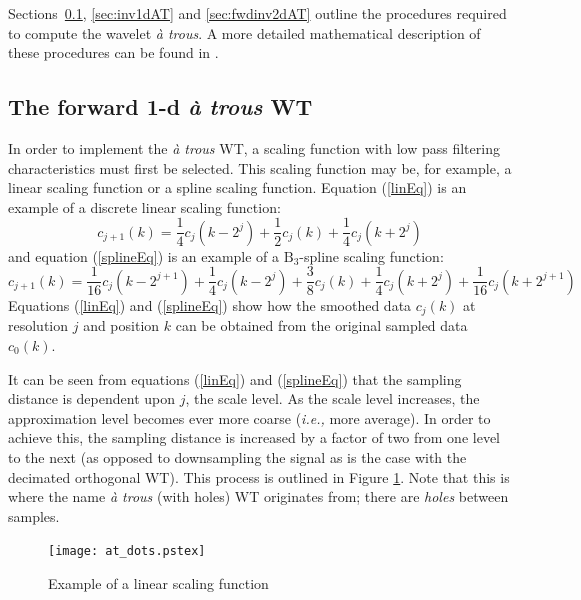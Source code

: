 \documentclass[12pt]{report}
\begin{document}
Sections~\ref{sec:fwd1dAT}, \ref{sec:inv1dAT} and \ref{sec:fwdinv2dAT} outline
the procedures required to compute the wavelet \emph{\`a trous}.
A more detailed mathematical description of these procedures can be found in
\cite{stark, holdschneider89, stark95, shensa1992}.

\subsection{The forward 1-d {\em \`a trous} WT}
\label{sec:fwd1dAT}
In order to implement the \emph{\`a trous} WT, a scaling function
with low pass filtering characteristics must first be selected. This
scaling function may be, for example, a linear scaling function or a
spline scaling function. 
Equation (\ref{linEq}) is an example of a discrete linear scaling function:
\begin{equation}
        c_{j+1}(k)=\frac{1}{4}c_{j}(k-2^{j})+\frac{1}{2}c_{j}(k)+
        \frac{1}{4}c_{j}(k+2^{j})
	\label{linEq}
\end{equation}
and equation (\ref{splineEq}) is an example of a $\mbox{B}_{3}$-spline
scaling function:
\begin{equation}
        c_{j+1}(k) = \frac{1}{16}c_{j}(k-2^{j+1})+\frac{1}{4}c_{j}(k-2^{j})+
                        \frac{3}{8}c_{j}(k)+
			\frac{1}{4}c_{j}(k+2^{j})+
                        \frac{1}{16}c_{j}(k+2^{j+1})
	\label{splineEq}
\end{equation}
Equations (\ref{linEq}) and (\ref{splineEq}) show how the smoothed data $c_{j}(k)$
at resolution $j$ and position $k$ can be obtained from the original
sampled data $c_{0}(k)$.

It can be seen from equations (\ref{linEq}) and (\ref{splineEq}) that the sampling distance is dependent 
upon $j$, the scale level.
As the scale level increases, the approximation level becomes ever more
coarse ({\em i.e.,} more average). 
In order to achieve this, the sampling distance is increased by a factor of two
from one level to the next (as opposed to downsampling the signal as is the case
with the decimated orthogonal WT). This process is 
outlined in Figure \ref{at_dots}. Note that this is where the name \emph{\`a trous}
(with holes) WT originates from; there are \emph{holes} between samples.
\begin{figure}[htb]
        \begin{center}
                \texttt{[image: at\_dots.pstex]}
		\caption{Example of a linear scaling function}
	\label{at_dots}
        \end{center}
\end{figure}
\end{document}
